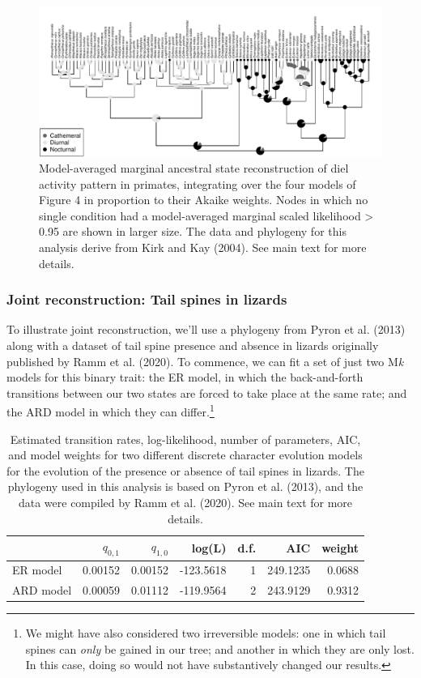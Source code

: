 \documentclass{article}
\begin{document}
\begin{figure}
\includegraphics[width=1\linewidth]{Revell.AncestralReconstruction_files/figure-latex/fig5-1} \caption{Model-averaged marginal ancestral state reconstruction of diel activity pattern in primates, integrating over the four models of Figure 4 in proportion to their Akaike weights. Nodes in which no single condition had a model-averaged marginal scaled likelihood > 0.95 are shown in larger size. The data and phylogeny for this analysis derive from Kirk and Kay (2004). See main text for more details.}\label{fig:fig5}
\end{figure}

\subsubsection{Joint reconstruction: Tail spines in lizards}\label{joint-reconstruction-tail-spines-in-lizards}

To illustrate joint reconstruction, we'll use a phylogeny from Pyron et al. (2013) along with a dataset of tail spine presence and absence in lizards originally published by Ramm et al. (2020). To commence, we can fit a set of just two M\emph{k} models for this binary trait: the ER model, in which the back-and-forth transitions between our two states are forced to take place at the same rate; and the ARD model in which they can differ.\footnote{We might have also considered two irreversible models: one in which tail spines can \emph{only} be gained in our tree; and another in which they are only lost. In this case, doing so would not have substantively changed our results.}

\begin{table}

\caption{\label{tab:unnamed-chunk-22}Estimated transition rates, log-likelihood, number of parameters, AIC, and model weights for two different discrete character evolution models for the evolution of the presence or absence of tail spines in lizards. The phylogeny used in this analysis is based on Pyron et al. (2013), and the data were compiled by Ramm et al. (2020). See main text for more details.}
\centering
\begin{tabular}[t]{l|r|r|r|r|r|r}
\hline
  & $q_{0,1}$ & $q_{1,0}$ & log(L) & d.f. & AIC & weight\\
\hline
ER model & 0.00152 & 0.00152 & -123.5618 & 1 & 249.1235 & 0.0688\\
\hline
ARD model & 0.00059 & 0.01112 & -119.9564 & 2 & 243.9129 & 0.9312\\
\hline
\end{tabular}
\end{table}
\end{document}
